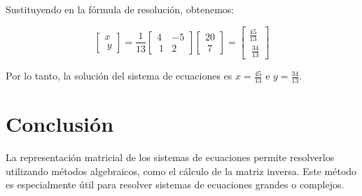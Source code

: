 \documentclass[12pt]{article}
\begin{document}
Sustituyendo en la fórmula de resolución, obtenemos:

$$\begin{bmatrix} x \\\ y \end{bmatrix} = \frac{1}{13}\begin{bmatrix} 4 & -5 \\\ 1 & 2 \end{bmatrix} \begin{bmatrix} 20 \\\ 7 \end{bmatrix} = \begin{bmatrix} \frac{45}{13} \\\ \frac{34}{13} \end{bmatrix}$$

Por lo tanto, la solución del sistema de ecuaciones es $x = \frac{45}{13}$ e $y = \frac{34}{13}$.

\section{Conclusión}

La representación matricial de los sistemas de ecuaciones permite resolverlos utilizando métodos algebraicos, como el cálculo de la matriz inversa. Este método es especialmente útil para resolver sistemas de ecuaciones grandes o complejos.
\end{document}
